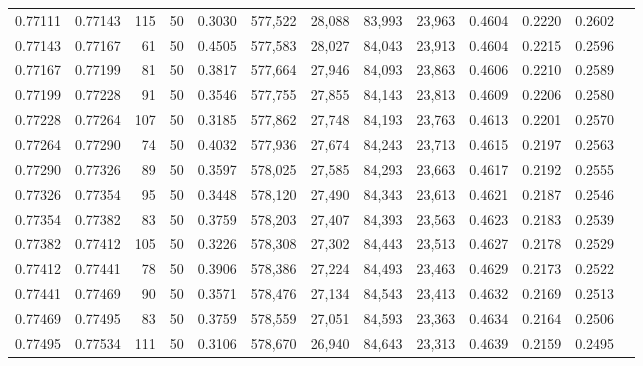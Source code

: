\begin{tabular}{rrrrrrrrrrrrr}
0.77111 & 0.77143 &   115 &  50 &                                     0.3030 & 577,522 &  28,088 &  83,993 &  23,963 & 0.4604 & 0.2220 & 0.2602 \\
0.77143 & 0.77167 &    61 &  50 &                                     0.4505 & 577,583 &  28,027 &  84,043 &  23,913 & 0.4604 & 0.2215 & 0.2596 \\
0.77167 & 0.77199 &    81 &  50 &                                     0.3817 & 577,664 &  27,946 &  84,093 &  23,863 & 0.4606 & 0.2210 & 0.2589 \\
0.77199 & 0.77228 &    91 &  50 &                                     0.3546 & 577,755 &  27,855 &  84,143 &  23,813 & 0.4609 & 0.2206 & 0.2580 \\
0.77228 & 0.77264 &   107 &  50 &                                     0.3185 & 577,862 &  27,748 &  84,193 &  23,763 & 0.4613 & 0.2201 & 0.2570 \\
0.77264 & 0.77290 &    74 &  50 &                                     0.4032 & 577,936 &  27,674 &  84,243 &  23,713 & 0.4615 & 0.2197 & 0.2563 \\
0.77290 & 0.77326 &    89 &  50 &                                     0.3597 & 578,025 &  27,585 &  84,293 &  23,663 & 0.4617 & 0.2192 & 0.2555 \\
0.77326 & 0.77354 &    95 &  50 &                                     0.3448 & 578,120 &  27,490 &  84,343 &  23,613 & 0.4621 & 0.2187 & 0.2546 \\
0.77354 & 0.77382 &    83 &  50 &                                     0.3759 & 578,203 &  27,407 &  84,393 &  23,563 & 0.4623 & 0.2183 & 0.2539 \\
0.77382 & 0.77412 &   105 &  50 &                                     0.3226 & 578,308 &  27,302 &  84,443 &  23,513 & 0.4627 & 0.2178 & 0.2529 \\
0.77412 & 0.77441 &    78 &  50 &                                     0.3906 & 578,386 &  27,224 &  84,493 &  23,463 & 0.4629 & 0.2173 & 0.2522 \\
0.77441 & 0.77469 &    90 &  50 &                                     0.3571 & 578,476 &  27,134 &  84,543 &  23,413 & 0.4632 & 0.2169 & 0.2513 \\
0.77469 & 0.77495 &    83 &  50 &                                     0.3759 & 578,559 &  27,051 &  84,593 &  23,363 & 0.4634 & 0.2164 & 0.2506 \\
0.77495 & 0.77534 &   111 &  50 &                                     0.3106 & 578,670 &  26,940 &  84,643 &  23,313 & 0.4639 & 0.2159 & 0.2495 \\

\end{tabular}

